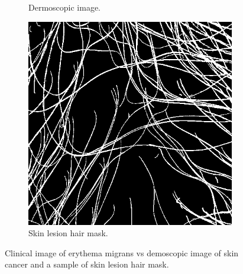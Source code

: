 \begin{figure}[htb!]
\begin{subfigure}[b]{0.3\textwidth}
		\caption{Dermoscopic image.}
		\label{fig:dermo-sample}
	\end{subfigure}
	\hfill
	\begin{subfigure}[b]{0.3\textwidth}
		\centering
		\includegraphics[width=\textwidth,keepaspectratio]{images/background/hair_mask_sample.png}
		\caption{Skin lesion hair mask.}
		\label{fig:hair-mask-sample}
	\end{subfigure}
	
	\caption[Clinical image vs dermoscopic image and a sample of skin lesion hair mask.]{Clinical image of erythema migrans \cite{EMPatterns} vs demoscopic image of skin cancer \cite{Tschandl2018} and a sample of skin lesion hair mask.}
	\label{fig:clinical-vs-dermo}
\end{figure}


